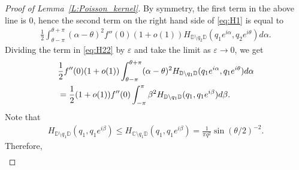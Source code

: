 \documentclass[11pt]{article}
\theoremstyle{remark}
\newcommand{\C}{\mathbb{C}}
\newcommand{\eps}{\varepsilon}
\numberwithin{equation}{section}
\begin{document}
\begin{proof}[Proof of Lemma~\ref{L:Poisson_kernel}]
By symmetry, the first term in the above line is $0$, hence the second term on the right hand side of \eqref{eq:H1} is equal to
\begin{align}\label{eq:H22}
\frac12  \int_{\theta-\pi}^{\theta+\pi} (\alpha-\theta)^2 f''(0) (1+o(1)) H_{{\mathbb{D}}\setminus q_2 {\mathbb{D}}} (q_1 e^{i\alpha}, q_2 e^{i\theta}) d \alpha.
\end{align}
Dividing the term in \eqref{eq:H22} by $\eps$ and take the limit as $\eps\to 0$, we get
\begin{align}
\notag
&\frac12  f''(0) (1+o(1)) \int_{\theta-\pi}^{\theta+\pi} (\alpha-\theta)^2 H_{{\mathbb{D}}\setminus q_1 {\mathbb{D}}} (q_1 e^{i\alpha}, q_1 e^{i\theta}) d \alpha\\
\label{eq:H23}
& =\frac12 (1+o(1)) f''(0) \int_{-\pi}^\pi \beta^2  H_{{\mathbb{D}}\setminus q_1 {\mathbb{D}}} (q_1, q_1 e^{i\beta}) d \beta.
\end{align}
Note that
\begin{align*}
H_{{\mathbb{D}}\setminus q_1 {\mathbb{D}}} (q_1, q_1 e^{i\beta}) \le H_{\C\setminus q_1 {\mathbb{D}}} (q_1, q_1 e^{i\beta}) =\frac{1}{\pi q^2} \sin(\theta/2)^{-2}.
\end{align*}
Therefore, 
\begin{align*}

\end{align*}
\end{proof}
\end{document}
